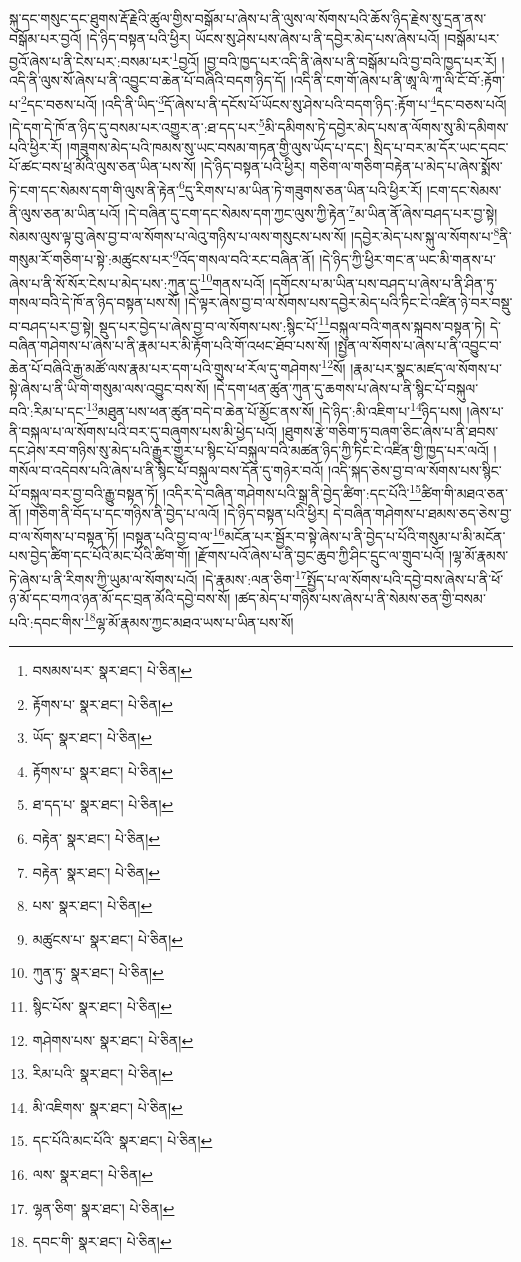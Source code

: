 སྐུ་དང་གསུང་དང་ཐུགས་རྡོ་རྗེའི་ཚུལ་གྱིས་བསྒོམ་པ་ཞེས་པ་ནི་ལུས་ལ་སོགས་པའི་ཆོས་ཉིད་རྗེས་སུ་དྲན་ནས་བསྒོམ་པར་བྱའོ། །དེ་ཉིད་བསྟན་པའི་ཕྱིར། ཡོངས་སུ་ཤེས་པས་ཞེས་པ་ནི་དབྱེར་མེད་པས་ཞེས་པའོ། །བསྒོམ་པར་བྱའོ་ཞེས་པ་ནི་ངེས་པར་:བསམ་པར་\footnote{བསམས་པར་  སྣར་ཐང་།  པེ་ཅིན། }བྱའོ། །བྱ་བའི་ཁྱད་པར་འདི་ནི་ཞེས་པ་ནི་བསྒོམ་པའི་བྱ་བའི་ཁྱད་པར་རོ། །འདི་ནི་ལུས་སོ་ཞེས་པ་ནི་འབྱུང་བ་ཆེན་པོ་བཞིའི་བདག་ཉིད་དོ། །འདི་ནི་ངག་གོ་ཞེས་པ་ནི་ཨཱ་ལི་ཀཱ་ལི་ངོ་བོ་:རྟོག་པ་\footnote{རྟོགས་པ་  སྣར་ཐང་།  པེ་ཅིན། }དང་བཅས་པའོ། །འདི་ནི་ཡིད་\footnote{ཡོད་  སྣར་ཐང་།  པེ་ཅིན། }དོ་ཞེས་པ་ནི་དངོས་པོ་ཡོངས་སུ་ཤེས་པའི་བདག་ཉིད་:རྟོག་པ་\footnote{རྟོགས་པ་  སྣར་ཐང་།  པེ་ཅིན། }དང་བཅས་པའོ། །དེ་དག་དེ་ཁོ་ན་ཉིད་དུ་བསམ་པར་འགྱུར་ན་:ཐ་དད་པར་\footnote{ཐ་དད་པ་  སྣར་ཐང་།  པེ་ཅིན། }མི་དམིགས་ཏེ་དབྱེར་མེད་པས་ན་ལོགས་སུ་མི་དམིགས་པའི་ཕྱིར་རོ། །གཟུགས་མེད་པའི་ཁམས་སུ་ཡང་བསམ་གཏན་གྱི་ལུས་ཡོད་པ་དང་། སྲིད་པ་བར་མ་དོར་ཡང་དབང་པོ་ཚང་བས་ཕྲ་མོའི་ལུས་ཅན་ཡིན་པས་སོ། །དེ་ཉིད་བསྟན་པའི་ཕྱིར། གཅིག་ལ་གཅིག་བརྟེན་པ་མེད་པ་ཞེས་སྨོས་ཏེ་ངག་དང་སེམས་དག་གི་ལུས་ནི་རྟེན་\footnote{བརྟེན་  སྣར་ཐང་།  པེ་ཅིན། }དུ་རིགས་པ་མ་ཡིན་ཏེ་གཟུགས་ཅན་ཡིན་པའི་ཕྱིར་རོ། །ངག་དང་སེམས་ནི་ལུས་ཅན་མ་ཡིན་པའོ། །དེ་བཞིན་དུ་ངག་དང་སེམས་དག་ཀྱང་ལུས་ཀྱི་རྟེན་\footnote{བརྟེན་  སྣར་ཐང་།  པེ་ཅིན། }མ་ཡིན་ནོ་ཞེས་བཤད་པར་བྱ་སྟེ། སེམས་ལུས་ལྟ་བུ་ཞེས་བྱ་བ་ལ་སོགས་པ་ལེའུ་གཉིས་པ་ལས་གསུངས་པས་སོ། །དབྱེར་མེད་པས་སྐུ་ལ་སོགས་པ་\footnote{པས་  སྣར་ཐང་།  པེ་ཅིན། }ནི་གསུམ་རོ་གཅིག་པ་སྟེ་:མཚུངས་པར་\footnote{མཚུངས་པ་  སྣར་ཐང་།  པེ་ཅིན། }འོད་གསལ་བའི་རང་བཞིན་ནོ། །དེ་ཉིད་ཀྱི་ཕྱིར་གང་ན་ཡང་མི་གནས་པ་ཞེས་པ་ནི་སོ་སོར་ངེས་པ་མེད་པས་:ཀུན་དུ་\footnote{ཀུན་ཏུ་  སྣར་ཐང་།  པེ་ཅིན། }གནས་པའོ། །དགོངས་པ་མ་ཡིན་པས་བཤད་པ་ཞེས་པ་ནི་ཤིན་ཏུ་གསལ་བའི་དེ་ཁོ་ན་ཉིད་བསྟན་པས་སོ། །དེ་ལྟར་ཞེས་བྱ་བ་ལ་སོགས་པས་དབྱེར་མེད་པའི་ཏིང་ངེ་འཛིན་ཉེ་བར་བསྡུ་བ་བཤད་པར་བྱ་སྟེ། སྡུད་པར་བྱེད་པ་ཞེས་བྱ་བ་ལ་སོགས་པས་:སྙིང་པོ་\footnote{སྙིང་པོས་  སྣར་ཐང་།  པེ་ཅིན། }བསྐུལ་བའི་གནས་སྐབས་བསྟན་ཏེ། དེ་བཞིན་གཤེགས་པ་ཞེས་པ་ནི་རྣམ་པར་མི་རྟོག་པའི་གོ་འཕང་ཐོབ་པས་སོ། །སྤྱན་ལ་སོགས་པ་ཞེས་པ་ནི་འབྱུང་བ་ཆེན་པོ་བཞིའི་རྒྱ་མཚོ་ལས་རྣམ་པར་དག་པའི་གྲུས་ཕ་རོལ་དུ་གཤེགས་\footnote{གཤེགས་པས་  སྣར་ཐང་།  པེ་ཅིན། }སོ། །རྣམ་པར་སྣང་མཛད་ལ་སོགས་པ་སྟེ་ཞེས་པ་ནི་ཡི་གེ་གསུམ་ལས་འབྱུང་བས་སོ། །དེ་དག་ཕན་ཚུན་ཀུན་དུ་ཆགས་པ་ཞེས་པ་ནི་སྙིང་པོ་བསྐུལ་བའི་:རིམ་པ་དང་\footnote{རིམ་པའི་  སྣར་ཐང་།  པེ་ཅིན། }མཐུན་པས་ཕན་ཚུན་བདེ་བ་ཆེན་པོ་མྱོང་ནས་སོ། །དེ་ཉིད་:མི་འཇིག་པ་\footnote{མི་འཇིགས་  སྣར་ཐང་།  པེ་ཅིན། }ཉིད་པས། །ཞེས་པ་ནི་བསྐལ་པ་ལ་སོགས་པའི་བར་དུ་བཞུགས་པས་མི་ཕྱེད་པའོ། །ཐུགས་རྩེ་གཅིག་ཏུ་བཞག་ཅིང་ཞེས་པ་ནི་ཐབས་དང་ཤེས་རབ་གཉིས་སུ་མེད་པའི་རྒྱུར་གྱུར་པ་སྙིང་པོ་བསྐུལ་བའི་མཚན་ཉིད་ཀྱི་ཏིང་ངེ་འཛིན་གྱི་ཁྱད་པར་ལའོ། །གསོལ་བ་འདེབས་པའི་ཞེས་པ་ནི་སྙིང་པོ་བསྐུལ་བས་དོན་དུ་གཉེར་བའོ། །འདི་སྐད་ཅེས་བྱ་བ་ལ་སོགས་པས་སྙིང་པོ་བསྐུལ་བར་བྱ་བའི་རྒྱུ་བསྟན་ཏོ། །འདིར་དེ་བཞིན་གཤེགས་པའི་སྒྲ་ནི་བྱེད་ཚིག་:དང་པོའི་\footnote{དང་པོའི་མང་པོའི་  སྣར་ཐང་།  པེ་ཅིན། }ཚིག་གི་མཐའ་ཅན་ནོ། །གཅིག་ནི་བོད་པ་དང་གཉིས་ནི་བྱེད་པ་ལའོ། །དེ་ཉིད་བསྟན་པའི་ཕྱིར། དེ་བཞིན་གཤེགས་པ་ཐམས་ཅད་ཅེས་བྱ་བ་ལ་སོགས་པ་བསྟན་ཏོ། །བསྟན་པའི་བྱ་བ་ལ་\footnote{ལས་  སྣར་ཐང་།  པེ་ཅིན། }མངོན་པར་སྦྱོར་བ་སྟེ་ཞེས་པ་ནི་བྱེད་པ་པོའི་གསུམ་པ་མི་མངོན་པས་བྱེད་ཚིག་དང་པོའི་མང་པོའི་ཚིག་གོ། །རྫོགས་པའོ་ཞེས་པ་ནི་བྱང་ཆུབ་ཀྱི་ཤིང་དྲུང་ལ་གྲུབ་པའོ། །ལྷ་མོ་རྣམས་ཏེ་ཞེས་པ་ནི་རིགས་ཀྱི་ཡུམ་ལ་སོགས་པའོ། །དེ་རྣམས་:ལན་ཅིག་\footnote{ལྷན་ཅིག་  སྣར་ཐང་།  པེ་ཅིན། }སྤྱོད་པ་ལ་སོགས་པའི་དབྱེ་བས་ཞེས་པ་ནི་ཕོ་ཉ་མོ་དང་བཀའ་ཉན་མོ་དང་བྲན་མོའི་དབྱེ་བས་སོ། །ཚད་མེད་པ་གཉིས་པས་ཞེས་པ་ནི་སེམས་ཅན་གྱི་བསམ་པའི་:དབང་གིས་\footnote{དབང་གི་  སྣར་ཐང་།  པེ་ཅིན། }ལྷ་མོ་རྣམས་ཀྱང་མཐའ་ཡས་པ་ཡིན་པས་སོ། 